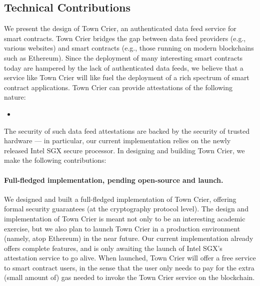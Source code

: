 \subsection{Technical Contributions}



We present the design of Town Crier, an authenticated data feed service for smart contracts. 
Town Crier bridges the gap between data 
feed providers (e.g., various websites)
and smart contracts (e.g., those running on modern blockchains
such as Ethereum). Since the deployment
of many interesting smart contracts 
today are hampered by the lack of authenticated data feeds,
we believe that a service like Town Crier will like
fuel the deployment of a rich spectrum  
of smart contract applications.
Town Crier can provide attestations of the following nature:

\begin{itemize}[leftmargin=3mm]
\item[]
\end{itemize}


The security of such data feed attestations
are backed by the security of trusted hardware --- in particular,
our current implementation relies on the newly released Intel SGX secure processor.
In designing and building Town Crier, we make the following contributions:

\paragraph{Full-fledged implementation, pending open-source and launch.}
We designed and built a full-fledged
implementation of Town Crier, offering formal security guarantees
(at the cryptography protocol level).
The design and implementation of Town Crier is meant not only to be  
an interesting academic exercise, but we also plan
to launch Town Crier 
in a production environment (namely, atop Ethereum)
in the near future. 
Our current implementation already offers complete features, and is
only awaiting  
the launch of Intel SGX's attestation service  
to go alive.
When launched, Town Crier will offer a free service to smart contract users, in the sense
that the user only needs to pay for the extra (small amount of) gas
needed to invoke the Town Crier
service on the blockchain. 


